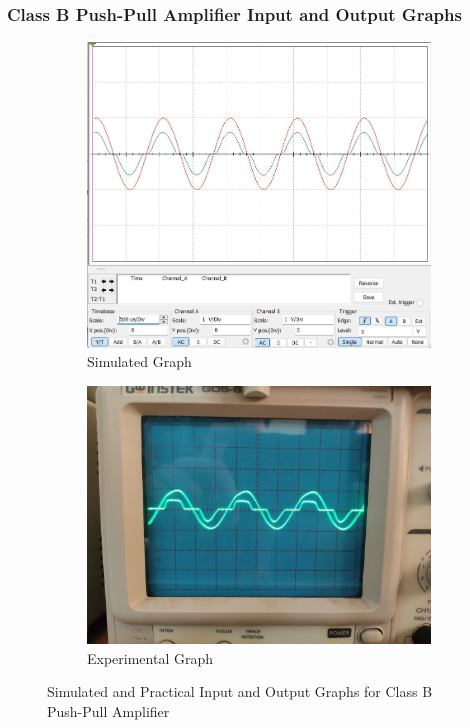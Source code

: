 \documentclass[12pt]{article}
\begin{document}
\subsubsection{Class B Push-Pull Amplifier Input and Output Graphs}
\begin{figure}[h!]
    \centering
    \begin{subfigure}{0.45\textwidth}
        \includegraphics[width=\textwidth]{Class_B_push-pull_Graph.jpg}
        \caption{Simulated Graph}
    \end{subfigure}
    \begin{subfigure}{0.45\textwidth}
        \includegraphics[width=\textwidth]{Class_B_push-pull_Practical.jpg}
        \caption{Experimental Graph}
    \end{subfigure}
    \caption{Simulated and Practical Input and Output Graphs for Class B Push-Pull Amplifier}
\end{figure}
\end{document}
